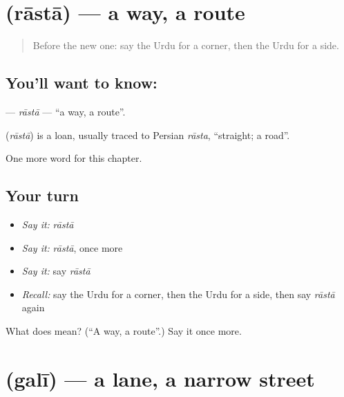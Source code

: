 \section[\texorpdfstring{\ur{راستہ} (rāstā)}{راستہ (rāstā)}]{ (rāstā) — a way, a route}

\label{lesson:UR-C98-rasta}



\begin{quote}
Before the new one: say the Urdu for a corner, then the Urdu for a side.
\end{quote}

\subsection*{You'll want to know: }
\textbf{} — \emph{rāstā} — \textquotedblleft{}a way, a route\textquotedblright{}.

\begin{cousinweb}
\textbf{} (\emph{rāstā}) is a loan, usually traced to Persian \emph{rāsta}, \textquotedblleft{}straight; a road\textquotedblright{}.
\end{cousinweb}

\begin{grammarlens}[title={What you've built}]
One more word for this chapter.
\end{grammarlens}

\subsection*{Your turn}
\begin{itemize}
\raggedright
  \item \emph{Say it:} \emph{rāstā}
  \item \emph{Say it:} \emph{rāstā}, once more
  \item \emph{Say it:} say \emph{rāstā}
  \item \emph{Recall:} say the Urdu for a corner, then the Urdu for a side, then say \emph{rāstā} again
\end{itemize}

\begin{tcolorbox}[breakable,colback=teal!4,colframe=teal!35!black,title={Before you move on}]
What does  mean? (\textquotedblleft{}A way, a route\textquotedblright{}.) Say it once more.
\end{tcolorbox}
\section[\texorpdfstring{\ur{گلی} (galī)}{گلی (galī)}]{ (galī) — a lane, a narrow street}

